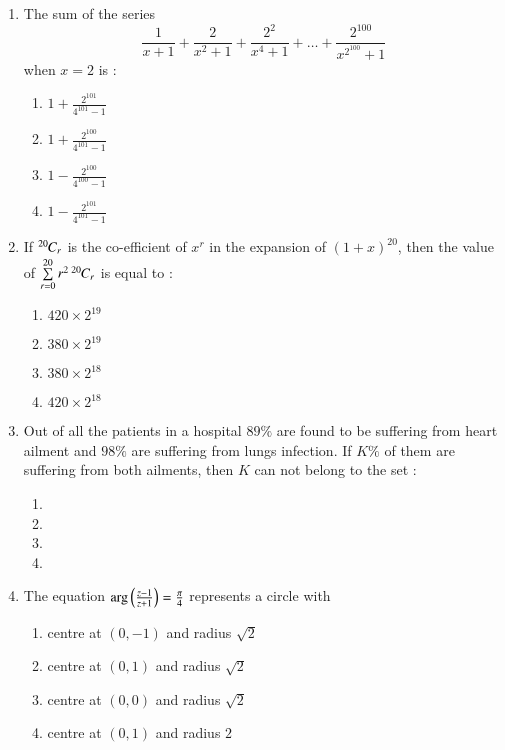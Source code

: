 \documentclass[journal,12pt,twocolumn]{IEEEtran}
\theoremstyle{remark}
\begin{document}
\begin{enumerate}
    \item The sum of the series
        $$\frac{1}{x+1}+\frac{2}{x^2+1}+\frac{2^2}{x^4+1}+\dots+\frac{2^{100}}{x^{2^{100}}+1}$$ when $x=2$ is :
        \begin{enumerate}
            \item $1+\frac{2^{101}}{4^{101}-1}$
            \item $1+\frac{2^{100}}{4^{101}-1}$
            \item $1-\frac{2^{100}}{4^{100}-1}$
            \item $1-\frac{2^{101}}{4^{101}-1}$
        \end{enumerate}


    \item If ${{}^{20}\mkern-1muC_{r}}$ is the co-efficient of $x^r$ in the expansion of $(1+x)^{20}$, then the value of $\sum\limits_{r=0}^{20}r^2\,{{}^{20}\mkern-1muC_{r}}$ is equal to :
        \begin{enumerate}
            \item $420\times2^{19}$
            \item $380\times2^{19}$
            \item $380\times2^{18}$
            \item $420\times2^{18}$
        \end{enumerate}

    \item Out of all the patients in a hospital $89\%$ are found to be suffering from heart ailment and $98\%$ are suffering from lungs infection. If $K\%$ of them are suffering from both ailments, then $K$ can not belong to the set : 
        \begin{enumerate}
            \item {}
            \item {}
            \item {}
            \item {} 
        \end{enumerate}

    \item The equation $\arg\left(\frac{z-1}{z+1}\right)=\frac{\pi}{4}$ represents a circle with
        \begin{enumerate}
            \item centre at $(0,-1)$ and radius $\sqrt{2}$
            \item centre at $(0,1)$ and radius $\sqrt{2}$
            \item centre at $(0,0)$ and radius $\sqrt{2}$
            \item centre at $(0,1)$ and radius $2$
        \end{enumerate}


\end{enumerate}
\end{document}
